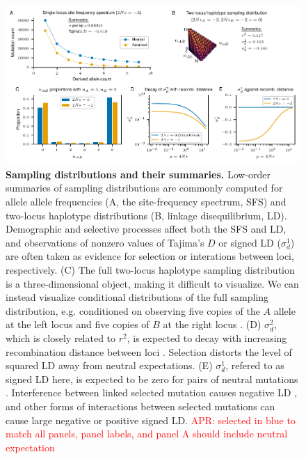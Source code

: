 \documentclass[]{article}
\newcommand{\comment}[1]{{\textcolor{red}{APR: #1}}}
\begin{document}
\begin{figure}[tb!]
    \centering
    \includegraphics{../figures/two-locus-spectrum/stats_summaries}
    \caption{
        \textbf{Sampling distributions and their summaries.}
        Low-order summaries of sampling distributions are commonly computed
        for allele allele frequencies (A, the site-frequency spectrum, SFS)
        and two-locus haplotype distributions (B, linkage disequilibrium, LD).
        Demographic and selective processes affect both the SFS and LD,
        and observations of nonzero values of Tajima's $D$ or signed LD
        ($\sigma_d^1$) are often taken as evidence for selection or interations
        between loci, respectively.
        (C) The full two-locus haplotype sampling distribution is a three-dimensional
        object, making it difficult to visualize. We can instead visualize conditional
        distributions of the full sampling distribution, e.g. conditioned on observing
        five copies of the $A$ allele at the left locus and five copies of $B$ at the
        right locus \citep[e.g.][]{Hudson2001-sg}.
        (D) $\sigma_d^2$, which is closely related to $r^2$, is expected to decay
        with increasing recombination distance between loci \citep{Ohta1969-ie}.
        Selection distorts the level of squared LD away from neutral expectations.
        (E) $\sigma_d^1$, refered to as signed LD here, is expected to be zero for
        pairs of neutral mutations \citep{Hill1968-vu}. Interference between linked
        selected mutation causes negative LD \citep{Hill1966-gv}, and other
        forms of interactions between selected mutations can cause large negative
        or positive signed LD.
        \comment{selected in blue to match all panels, panel labels, and panel A
        should include neutral expectation}
    }
    \label{fig:TwoLocusFS}
\end{figure}
\end{document}

